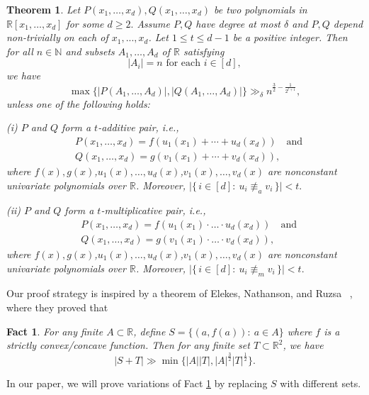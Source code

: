 \documentclass[12pt,reqno]{amsart}
\numberwithin{equation}{section}
\newtheorem{theorem}{Theorem}[section]
\newtheorem{fact}{Fact}[section]
\begin{document}
\begin{theorem}\label{thm:main2} Let $P(x_{1},\ldots,x_{d}),Q(x_{1},\ldots,x_{d})$ be two polynomials in $ \mathbb{R}[x_{1},\ldots,x_{d}]$  for some $d\geq 2.$ Assume $P,Q$ have degree at most $\delta$ and $P,Q$ depend  non-trivially on each of $x_1,...,x_d$. Let $1\leq t\leq d-1$ be a positive integer. Then for all $n \in \mathbb{N}$ and subsets $A_{1},\ldots, A_{d}$ of $\mathbb{R}$ satisfying \[|A_{i}|=n \text{~for each~} i\in [d],\] we have
$$
\max \{|P(A_{1},\ldots, A_{d})|,|Q(A_{1},\ldots, A_{d})|\} \gg_{\delta} n^{\frac{3}{2}-\frac{1}{2^{t+1}}},
$$
unless one of the following holds:

(i) $P$ and $Q$ form a $t$-additive pair, i.e., \begin{align*}&P(x_{1},\ldots,x_{d})=f( u_{1}(x_{1})+\cdots+ u_{d}(x_{d}))\quad \text{and}\\&Q(x_{1},\ldots,x_{d})=g( v_{1}(x_{1})+\cdots+v_{d}(x_{d})),\end{align*} where $f(x), g(x)$,$u_{1}(x),\ldots,u_{d}(x)$,$v_{1}(x),\ldots,v_{d}(x)$ are nonconstant univariate polynomials over $\mathbb{R}$. Moreover, \(\bigl|\{\,i\in[d]:\ u_i \not\equiv_a v_i\,\}\bigr|<t.\)






(ii) $P$ and $Q$ form a $t$-multiplicative pair, i.e.,  \begin{align*}&P(x_{1},\ldots,x_{d})=f( u_{1}(x_{1})\cdot\ldots\cdot u_{d}(x_{d}))\quad \text{and}\\&Q(x_{1},\ldots,x_{d})=g( v_{1}(x_{1}) \cdot\ldots\cdot v_{d}(x_{d})),\end{align*}
where $f(x), g(x)$,$u_{1}(x),\ldots,u_{d}(x)$,$v_{1}(x),\ldots,v_{d}(x)$  are nonconstant univariate polynomials over $\mathbb{R}$.  Moreover, \(\bigl|\{\,i\in[d]:\ u_i \not\equiv_m v_i\,\}\bigr|<t.\)




\end{theorem}

Our proof strategy is inspired by a theorem of Elekes, Nathanson, and Ruzsa ~\cite{elekes2000convexity}, where they proved that 
\begin{fact}\label{fact:enr}
	For any finite $A\subset \mathbb{R}$, define \(S=\{(a,f(a)):\ a\in A\}\)
 where $f$ is a strictly convex/concave function. Then  for any finite set $T\subset\mathbb{R}^2$, we have  
    \[	|S+T|\gg \min\{|A||T|,|A|^{\frac{3}{2}}|T|^{\frac{1}{2}}\} .\]
	\end{fact}
In our paper, we will prove variations of Fact \ref{fact:enr} by replacing $S$ with different sets.
\end{document}
